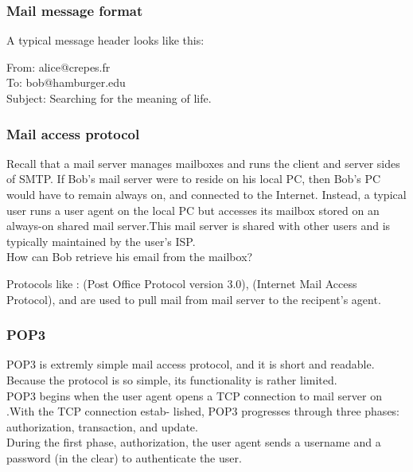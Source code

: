\subsubsection{Mail message format}

\hf
A typical message header looks like this:
\begin{center}
    From: alice@crepes.fr\\
    To: bob@hamburger.edu\\
    Subject: Searching for the meaning of life.
\end{center}

\subsubsection{Mail access protocol}

\hf
Recall that a mail server manages mailboxes and runs the
client and server sides of SMTP. If Bob's mail server were to reside
on his local PC, then Bob's PC would have to remain always on, and connected
to the Internet. Instead, a typical user runs a user agent on the local PC but accesses
its mailbox stored on an always-on shared mail server.This mail server is shared
with other users and is typically maintained by the user’s ISP.\\

How can Bob retrieve his email from the mailbox?

Protocols like : (Post Office Protocol version 3.0),  (Internet Mail
Access Protocol), and  are used to pull mail from mail server to the recipent's 
agent.

\subsubsection{POP3}

\hf POP3 is extremly simple mail access protocol, and it is short and readable. Because the protocol is so simple, its functionality is
rather limited.\\

POP3 begins when the user agent opens a TCP connection to mail server on .With the TCP connection estab-
lished, POP3 progresses through three phases: authorization, transaction, and update.\\

During the first phase, authorization, the user agent sends a username and a password
(in the clear) to authenticate the user.\\


